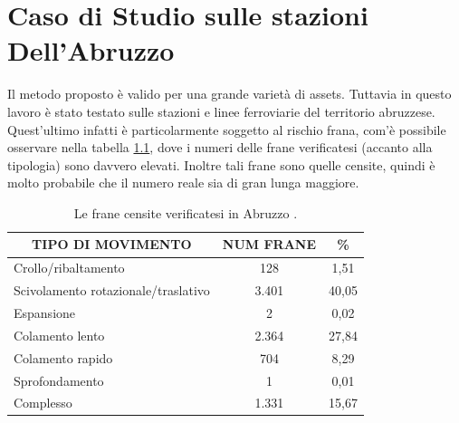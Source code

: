 
\chapter{Caso di Studio sulle stazioni Dell'Abruzzo} %
Il metodo proposto è valido per una grande varietà di assets. Tuttavia in questo lavoro è stato testato sulle stazioni e linee ferroviarie del territorio abruzzese. Quest'ultimo infatti è particolarmente soggetto al rischio frana, com'è possibile osservare nella tabella \ref{tab:riassunto_frane}, dove i numeri delle frane verificatesi (accanto alla tipologia) sono davvero elevati. Inoltre tali frane sono quelle censite, quindi è molto probabile che il numero reale sia di gran lunga maggiore.

\begin{table}[h]
	\centering
	\caption{Le frane censite verificatesi in Abruzzo \cite{d200718}.}
	\label{tab:riassunto_frane}
	\begin{tabular}{|l|c|c|}
		\hline
		\multicolumn{1}{|c|}{\cellcolor{gray!50} \textbf{TIPO DI MOVIMENTO}} & {\cellcolor{gray!50}\textbf{NUM FRANE}} & {\cellcolor{gray!50} \textbf{\%}} \\ \hline
		Crollo/ribaltamento & 128  & 1,51   \\ \hline
		Scivolamento rotazionale/traslativo  & 3.401  & 40,05                              \\ \hline
		Espansione                                                                                      & 2                                        & 0,02                               \\ \hline
		Colamento lento                                                                                 & 2.364                                    & 27,84                              \\ \hline
		Colamento rapido                                                                                & 704                                      & 8,29                               \\ \hline
		Sprofondamento                                                                                  & 1                                        & 0,01                               \\ \hline
		Complesso                                                                                       & 1.331                                    & 15,67                              \\ \hline

\end{tabular}
\end{table}
